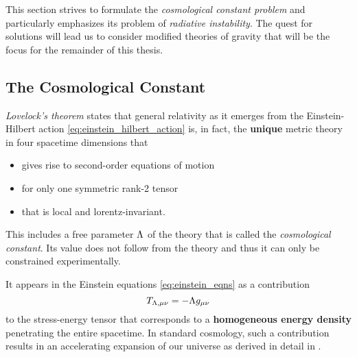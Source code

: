 \documentclass[12pt,parskip=half]{scrreprt}
\newcommand{\addref}{\todo[color=black!20]{ref.}}
\begin{document}
This section strives to formulate the \emph{cosmological constant problem} and particularly emphasizes its problem of \emph{radiative instability}. The quest for solutions will lead us to consider modified theories of gravity that will be the focus for the remainder of this thesis.

\subsection{The Cosmological Constant}\label{sec:cc_intro}

\emph{Lovelock's theorem}\label{sec:lovelock} states that general relativity as it emerges from the Einstein-Hilbert action \ref{eq:einstein_hilbert_action} is, in fact, the \textbf{unique} metric theory in four spacetime dimensions that \addref
\begin{itemize}
	\item gives rise to second-order equations of motion
	\item for only one symmetric rank-2 tensor
	\item that is local and lorentz-invariant.
\end{itemize}
This includes a free parameter \(\Lambda\) of the theory that is called the \emph{cosmological constant}. Its value does not follow from the theory and thus it can only be constrained experimentally.

It appears in the Einstein equations \ref{eq:einstein_eqns} as a contribution
\begin{equation}
	T_{\Lambda\textnormal{,}\mu\nu} = - \Lambda g_{\mu\nu}
\end{equation}
to the stress-energy tensor that corresponds to a \textbf{homogeneous energy density} penetrating the entire spacetime. In standard \FLRW cosmology, such a contribution results in an accelerating expansion of our universe as derived in detail in .
\end{document}
